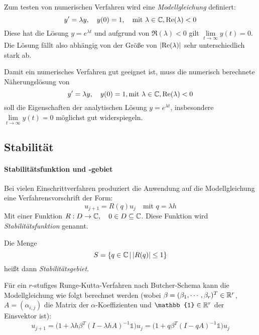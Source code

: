 			Zum testen von numerischen Verfahren wird eine \textit{Modellgleichung} definiert:
			\begin{equation*}
				y' = \lambda y, \quad y(0) = 1, \quad \textrm{mit } \lambda \in \mathbb{C}, \Re(\lambda) < 0
			\end{equation*}
			Diese hat die Lösung \( y = e^{\lambda t} \) und aufgrund von \( \Re(\lambda) < 0 \) gilt \( \lim\limits_{t \rightarrow \infty} y(t) = 0 \). Die Lösung fällt also abhängig von der Größe von \(\abs{\Re(\lambda)}\) sehr unterschiedlich stark ab.

			Damit ein numerisches Verfahren gut geeignet ist, muss die numerisch berechnete Näherungslösung von
			\begin{equation*}
				y' = \lambda y, \quad y(0) = 1, \textrm{mit } \lambda \in \mathbb{C}, \Re(\lambda) < 0
			\end{equation*}
			soll die Eigenschaften der analytischen Lösung \( y = e^{\lambda t} \), insbesondere \( \lim\limits_{t \rightarrow \infty} y(t) = 0 \) möglichst gut widerspiegeln.

		\subsection{Stabilität}
			\paragraph{Stabilitätsfunktion und -gebiet}
				Bei vielen Einschrittverfahren produziert die Anwendung auf die Modellgleichung eine Verfahrensvorschrift der Form:
				\begin{equation*}
					u_{j+1} = R(q)u_j \quad \textrm{mit } q = \lambda h
				\end{equation*}
				Mit einer Funktion \( R : D \rightarrow \mathbb{C}, \quad 0 \in D \subseteq \mathbb{C} \). Diese Funktion wird \textit{Stabilitätsfunktion} genannt.

				Die Menge \[ S = \{ q \in \mathbb{C} \,\vert\, \abs{R(q)} \leq 1 \} \] heißt dann \textit{Stabilitätsgebiet}.

				Für ein \(r\)-stufiges Runge-Kutta-Verfahren nach Butcher-Schema kann die Modellgleichung wie folgt berechnet werden (wobei \( \beta = (\beta_1, \cdots, \beta_r)^T \in \mathbb{R}^r \), \( A = (\alpha_{i,j}) \) die Matrix der \(\alpha\)-Koeffizienten und \( \mathbb{1} \in \R^r \) der Einsvektor ist):
				\begin{equation*}
					u_{j+1} = \big( 1 + \lambda h \beta^T (I - \lambda h A)^{-1} \mathbb{1} \big) u_j = \big( 1 + q \beta^T (I - qA)^{-1} \mathbb{1} \big) u_j
				\end{equation*}

